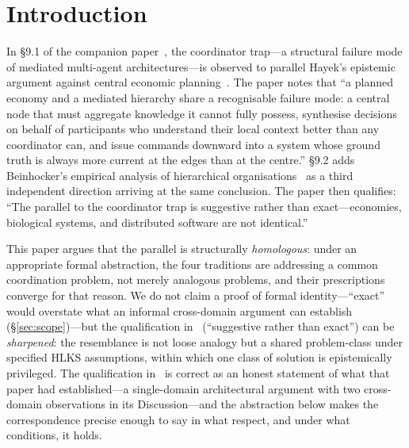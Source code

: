 \documentclass[11pt]{article}
\theoremstyle{definition}
\theoremstyle{plain}
\theoremstyle{plain}
\begin{document}
\begin{abstract}
a measurement on a single substrate in which broker-mediated decisions
exhibit mean latency two to three orders of magnitude higher than locally
evaluated ones (the within-paradigm gradient the theorem predicts), and a
constructive pull instantiation---a tuple-space layer built entirely from
the substrate's public primitives---whose test suite verifies exactly-once-effect
distribution with no participant holding a view of any other's state, and
survival of the rendezvous point itself through emergent, coordinator-free
failover. We close with an
honest accounting of the open questions:
the formal status of the theorem, the boundary conditions of the HLKS model,
the Holland/Burgess tension, and the further structural properties that
correctness against external and internal capture would require---properties
that are the subject of a companion paper currently in preparation.
\end{abstract}

\section{Introduction}

In \S9.1 of the companion paper~\cite{nicholson2026}, the coordinator trap---a
structural failure mode of mediated multi-agent architectures---is observed to
parallel Hayek's epistemic argument against central economic
planning~\cite{hayek1945}. The paper notes that ``a planned economy and a
mediated hierarchy share a recognisable failure mode: a central node that must
aggregate knowledge it cannot fully possess, synthesise decisions on behalf of
participants who understand their local context better than any coordinator
can, and issue commands downward into a system whose ground truth is always
more current at the edges than at the centre.'' \S9.2 adds Beinhocker's
empirical analysis of hierarchical organisations~\cite{beinhocker2006} as a
third independent direction arriving at the same conclusion. The paper then
qualifies: ``The parallel to the coordinator trap is suggestive rather than
exact---economies, biological systems, and distributed software are not
identical.''

This paper argues that the parallel is structurally \emph{homologous}: under an
appropriate formal abstraction, the four traditions are addressing a common
coordination problem, not merely analogous problems, and their prescriptions
converge for that reason. We do not claim a proof of formal identity---``exact''
would overstate what an informal cross-domain argument can establish
(\S\ref{sec:scope})---but the qualification in~\cite{nicholson2026} (``suggestive
rather than exact'') can be \emph{sharpened}: the resemblance is not loose analogy
but a shared problem-class under specified HLKS assumptions, within which one class
of solution is epistemically privileged. The qualification in~\cite{nicholson2026}
is correct as an honest statement of what that paper had established---a
single-domain architectural argument with two cross-domain observations in its
Discussion---and the abstraction below makes the correspondence precise enough to
say in what respect, and under what conditions, it holds.
\end{document}
